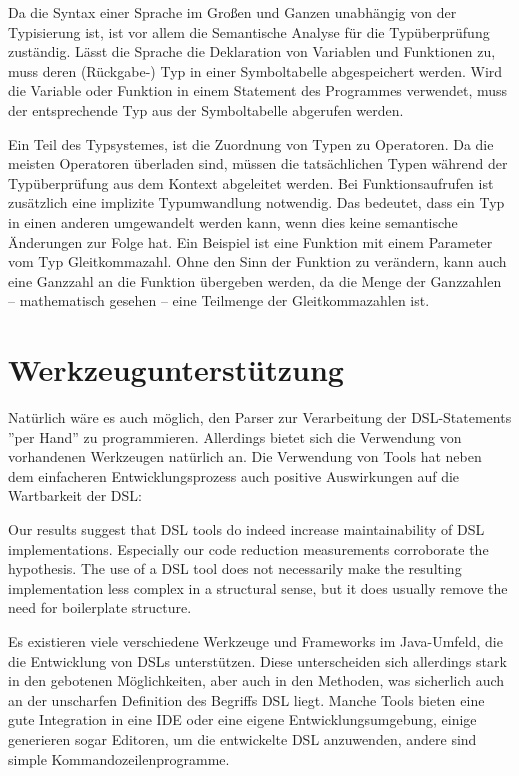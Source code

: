 Da die Syntax einer Sprache im Großen und Ganzen unabhängig von der Typisierung ist, ist vor allem die Semantische Analyse für die Typüberprüfung zuständig. Lässt die Sprache die Deklaration von Variablen und Funktionen zu, muss deren (Rückgabe-) Typ in einer Symboltabelle abgespeichert werden. Wird die Variable oder Funktion in einem Statement des Programmes verwendet, muss der entsprechende Typ aus der Symboltabelle abgerufen werden.

Ein Teil des Typsystemes, ist die Zuordnung von Typen zu Operatoren. Da die meisten Operatoren überladen sind, müssen die tatsächlichen Typen während der Typüberprüfung aus dem Kontext abgeleitet werden. Bei Funktionsaufrufen ist zusätzlich eine implizite Typumwandlung notwendig. Das bedeutet, dass ein Typ in einen anderen umgewandelt werden kann, wenn dies keine semantische Änderungen zur Folge hat. Ein Beispiel ist eine Funktion mit einem Parameter vom Typ Gleitkommazahl. Ohne den Sinn der Funktion zu verändern, kann auch eine Ganzzahl an die Funktion übergeben werden, da die Menge der Ganzzahlen -- mathematisch gesehen -- eine Teilmenge der Gleitkommazahlen ist.


\chapter{Werkzeugunterstützung}
\label{chapter_tools}

Natürlich wäre es auch möglich, den Parser zur Verarbeitung der DSL-Statements ''per Hand'' zu programmieren. Allerdings bietet sich die Verwendung von vorhandenen Werkzeugen natürlich an. Die Verwendung von Tools hat neben dem einfacheren Entwicklungsprozess auch positive Aus\-wir\-kun\-gen auf die Wartbarkeit der DSL:

\begin{myquote}
Our results suggest that DSL tools do indeed increase maintainability
of DSL implementations. Especially our code reduction measurements
corroborate the hypothesis. The use of a DSL tool does
not necessarily make the resulting implementation less complex in
a structural sense, but it does usually remove the need for boilerplate
structure. \cite{KlSt10}
\end{myquote}

Es existieren viele verschiedene Werkzeuge und Frameworks im  Java-Umfeld, die die Entwicklung von DSLs unterstützen. Diese unterscheiden sich allerdings stark in den gebotenen Möglichkeiten, aber auch in den Methoden, was sicherlich auch an der unscharfen Definition des Begriffs DSL liegt. Manche Tools bieten eine gute Integration in eine IDE oder eine eigene Entwicklungsumgebung, einige generieren sogar Editoren, um die entwickelte DSL anzuwenden, andere sind simple Kommandozeilenprogramme.

